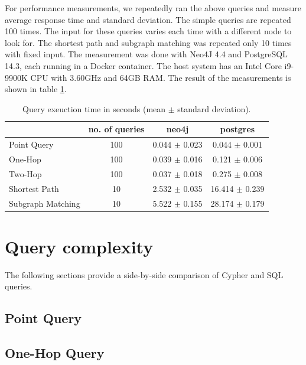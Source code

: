 \documentclass[11pt, a4paper,oneside,chapterprefix=false]{scrbook}
\begin{document}
For performance measurements, we repeatedly ran the above queries and measure average response time and standard deviation.
The simple queries are repeated 100 times.
The input for these queries varies each time with a different node to look for.
The shortest path and subgraph matching was repeated only 10 times with fixed input.
The measurement was done with Neo4J 4.4 and PostgreSQL 14.3, each running in a Docker container.
The host system has an Intel Core i9-9900K CPU with 3.60GHz and 64GB RAM.
The result of the measurements is shown in table \ref{table:performance}.

\begin{table}[h]
	\begin{center}
		\begin{tabular}{ |l|c|c|c| }
			\hline
			& no. of queries & neo4j & postgres \\
			\hline
			Point Query & 100 & 0.044 $\pm$ 0.023 & 0.044 $\pm$ 0.001 \\
			One-Hop & 100 & 0.039 $\pm$ 0.016 & 0.121 $\pm$ 0.006 \\
			Two-Hop & 100 & 0.037 $\pm$ 0.018 & 0.275 $\pm$ 0.008 \\
			Shortest Path & 10 & 2.532 $\pm$ 0.035 & 16.414 $\pm$ 0.239 \\
			Subgraph Matching & 10 & 5.522 $\pm$ 0.155 & 28.174 $\pm$ 0.179 \\
			\hline
		\end{tabular}
		\caption{\label{table:performance} Query exeuction time in seconds (mean $\pm$ standard deviation).}
	\end{center}
\end{table}

\section{Query complexity}

The following sections provide a side-by-side comparison of Cypher and SQL queries.

\subsection{Point Query} \label{sec:result:point}


\subsection{One-Hop Query}\label{sec:result:one-hop}

\end{document}
